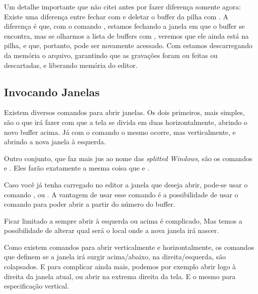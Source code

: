 Um detalhe importante que não citei antes por fazer diferença somente agora:
Existe uma diferença entre fechar com  e deletar o buffer da pilha com .
A diferença é que, com o comando , estamos fechando a janela em que o buffer se encontra,
mas se olharmos a lista de buffers com , veremos que ele ainda está na pilha, e que,
portanto, pode ser novamente acessado.
Com  estamos descarregando da memória o arquivo, garantindo que as gravações foram ou feitas ou descartadas,
e liberando memória do editor.

\subsection{Invocando Janelas}
Existem diversos comandos para abrir janelas.
Os dois primeiros, mais simples, são o  que irá fazer com que a tela
se divida em duas horizontalmente, abrindo o novo buffer acima.
Já com o comando  o mesmo ocorre, mas verticalmente, e abrindo a nova janela à esquerda.


Outro conjunto, que faz mais jus ao nome das \textit{splitted Windows}, são os comandos  e 
.
Eles farão exatamente a mesma coisa que  e .


Caso você já tenha carregado no editor a janela que deseja abrir, pode-se usar o comando
, ou .
A vantagem de usar esse comando é a possibilidade de usar o comando 
para poder abrir a partir do número do buffer.


Ficar limitado a sempre abrir à esquerda ou acima é complicado,
Mas temos a possibilidade de alterar qual será o local onde a nova janela irá nascer.

Como existem comandos para abrir verticalmente e horizontalmente, os comandos que definem
se a janela irá surgir acima/abaixo, na direita/esquerda, são colapsados.
E para complicar ainda mais, podemos por exemplo abrir logo à direita da janela atual, ou
abrir na extrema direita da tela.
E o mesmo para especificação vertical.

